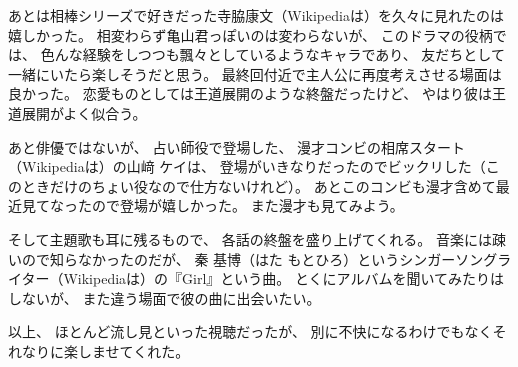 \documentclass[C:/souji/all-note/note]{subfiles}
\begin{document}
あとは相棒シリーズで好きだった寺脇康文（Wikipediaは\cite{Wiki016}）を久々に見れたのは嬉しかった。
相変わらず亀山君っぽいのは変わらないが、
このドラマの役柄では、
色んな経験をしつつも飄々としているようなキャラであり、
友だちとして一緒にいたら楽しそうだと思う。
最終回付近で主人公に再度考えさせる場面は良かった。
恋愛ものとしては王道展開のような終盤だったけど、
やはり彼は王道展開がよく似合う。

あと俳優ではないが、
占い師役で登場した、
漫才コンビの相席スタート（Wikipediaは\cite{Wiki018}）の山﨑 ケイは、
登場がいきなりだったのでビックリした（このときだけのちょい役なので仕方ないけれど）。
あとこのコンビも漫才含めて最近見てなったので登場が嬉しかった。
また漫才も見てみよう。

そして主題歌も耳に残るもので、
各話の終盤を盛り上げてくれる。
音楽には疎いので知らなかったのだが、
秦 基博（はた もとひろ）というシンガーソングライター（Wikipediaは\cite{Wiki017}）の『Girl』という曲。
とくにアルバムを聞いてみたりはしないが、
また違う場面で彼の曲に出会いたい。

以上、
ほとんど流し見といった視聴だったが、
別に不快になるわけでもなくそれなりに楽しませてくれた。
\end{document}
